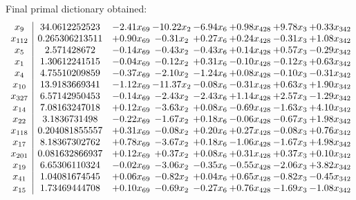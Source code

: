 \documentclass[8pt]{article}
\begin{document}
 Final primal dictionary obtained: 
\[\begin{array}{c| c c@{\hskip 2pt} c@{\hskip 2pt} c@{\hskip 2pt} c@{\hskip 2pt} c@{\hskip 2pt} c@{\hskip 2pt} }
 x_{9}   &  34.0612252523 & -2.41 x_{69} & -10.22 x_{2} & -6.94 x_{6} & +  0.98 x_{428} & +  9.78 x_{3} & +  0.33 x_{342}\\
 x_{112}   &  0.265306213511 & +  0.90 x_{69} & -0.31 x_{2} & +  0.27 x_{6} & +  0.24 x_{428} & -0.31 x_{3} & +  1.08 x_{342}\\
 x_{5}   &  2.571428672 & -0.14 x_{69} & -0.43 x_{2} & -0.43 x_{6} & +  0.14 x_{428} & +  0.57 x_{3} & -0.29 x_{342}\\
 x_{1}   &  1.30612241515 & -0.04 x_{69} & -0.12 x_{2} & +  0.31 x_{6} & -0.10 x_{428} & -0.12 x_{3} & +  0.63 x_{342}\\
 x_{4}   &  4.75510209859 & -0.37 x_{69} & -2.10 x_{2} & -1.24 x_{6} & +  0.08 x_{428} & -0.10 x_{3} & -0.31 x_{342}\\
 x_{10}   &  13.9183669341 & -1.12 x_{69} & -11.37 x_{2} & -0.08 x_{6} & -0.31 x_{428} & +  0.63 x_{3} & +  1.90 x_{342}\\
 x_{327}   &  6.57142950453 & -0.14 x_{69} & -2.43 x_{2} & -2.43 x_{6} & +  1.14 x_{428} & +  2.57 x_{3} & -1.29 x_{342}\\
 x_{14}   &  7.08163247018 & +  0.12 x_{69} & -3.63 x_{2} & +  0.08 x_{6} & -0.69 x_{428} & -1.63 x_{3} & +  4.10 x_{342}\\
 x_{22}   &  3.1836731498 & -0.22 x_{69} & -1.67 x_{2} & +  0.18 x_{6} & -0.06 x_{428} & -0.67 x_{3} & +  1.98 x_{342}\\
 x_{118}   &  0.204081855557 & +  0.31 x_{69} & -0.08 x_{2} & +  0.20 x_{6} & +  0.27 x_{428} & -0.08 x_{3} & +  0.76 x_{342}\\
 x_{17}   &  8.18367302762 & +  0.78 x_{69} & -3.67 x_{2} & +  0.18 x_{6} & -1.06 x_{428} & -1.67 x_{3} & +  4.98 x_{342}\\
 x_{201}   &  0.081632866937 & +  0.12 x_{69} & +  0.37 x_{2} & +  0.08 x_{6} & +  0.31 x_{428} & +  0.37 x_{3} & +  0.10 x_{342}\\
 x_{19}   &  6.65306110324 & -0.02 x_{69} & -3.06 x_{2} & -0.35 x_{6} & -0.55 x_{428} & -2.06 x_{3} & +  3.82 x_{342}\\
 x_{41}   &  1.04081674545 & +  0.06 x_{69} & -0.82 x_{2} & +  0.04 x_{6} & +  0.65 x_{428} & -0.82 x_{3} & -0.45 x_{342}\\
 x_{15}   &  1.73469444708 & +  0.10 x_{69} & -0.69 x_{2} & -0.27 x_{6} & +  0.76 x_{428} & -1.69 x_{3} & -1.08 x_{342}\\

\end{array}\]
\end{document}

